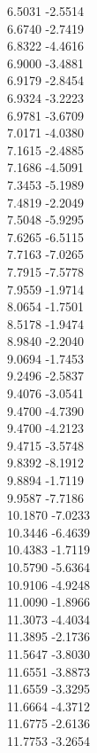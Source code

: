 {    6.5031	-2.5514\\
    6.6740	-2.7419\\
    6.8322	-4.4616\\
    6.9000	-3.4881\\
    6.9179	-2.8454\\
    6.9324	-3.2223\\
    6.9781	-3.6709\\
    7.0171	-4.0380\\
    7.1615	-2.4885\\
    7.1686	-4.5091\\
    7.3453	-5.1989\\
    7.4819	-2.2049\\
    7.5048	-5.9295\\
    7.6265	-6.5115\\
    7.7163	-7.0265\\
    7.7915	-7.5778\\
    7.9559	-1.9714\\
    8.0654	-1.7501\\
    8.5178	-1.9474\\
    8.9840	-2.2040\\
    9.0694	-1.7453\\
    9.2496	-2.5837\\
    9.4076	-3.0541\\
    9.4700	-4.7390\\
    9.4700	-4.2123\\
    9.4715	-3.5748\\
    9.8392	-8.1912\\
    9.8894	-1.7119\\
    9.9587	-7.7186\\
    10.1870	-7.0233\\
    10.3446	-6.4639\\
    10.4383	-1.7119\\
    10.5790	-5.6364\\
    10.9106	-4.9248\\
    11.0090	-1.8966\\
    11.3073	-4.4034\\
    11.3895	-2.1736\\
    11.5647	-3.8030\\
    11.6551	-3.8873\\
    11.6559	-3.3295\\
    11.6664	-4.3712\\
    11.6775	-2.6136\\
    11.7753	-3.2654\\
}
